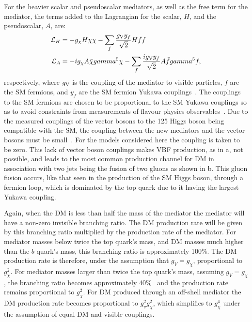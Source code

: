 For the heavier scalar and pseudoscalar mediators, as well as the free term for the mediator, the terms added to the Lagrangian for the scalar, $H$, and the pseudoscalar, $A$, are:
\begin{align}
  \mathcal{L}_{H}&=-g_{\chi}H\bar{\chi}\chi-\sum_{f}\frac{g_{\rm{V}}y_{f}}{\sqrt{2}}H\bar{f}f\\
  \mathcal{L}_{A}&=-ig_{\chi}A\bar{\chi}\gamma^{5}\chi-\sum_{f}\frac{ig_{\rm{V}}y_{f}}{\sqrt{2}}A\bar{f}\gamma^{5}f,\\
\end{align}
respectively, where $g_{\rm{V}}$ is the coupling of the mediator to visible particles, $f$ are the \ac{SM} fermions, and $y_{f}$ are the \ac{SM} fermion Yukawa couplings~\cite{PhysRevD.91.015017}. The couplings to the \ac{SM} fermions are chosen to be proportional to the \ac{SM} Yukawa couplings so as to avoid constraints from measurements of flavour physics observables~\cite{D'Ambrosio2002155}. Due to the measured couplings of the vector bosons to the 125 \GeV Higgs boson being compatible with the \ac{SM}, the coupling between the new mediators and the vector bosons must be small~\cite{CMS-PAS-HIG-15-002}. For the models considered here the coupling is taken to be zero. This lack of vector boson couplings makes \ac{VBF} production, as in a, not possible, and leads to the most common production channel for \ac{DM} in association with two jets being the fusion of two gluons as shown in b. This gluon fusion occurs, like that seen in the production of the \ac{SM} Higgs boson, through a fermion loop, which is dominated by the top quark due to it having the largest Yukawa coupling.

Again, when the \ac{DM} is less than half the mass of the mediator the mediator will have a non-zero invisible branching ratio. The \ac{DM} production rate will be given by this branching ratio multiplied by the production rate of the mediator. For mediator masses below twice the top quark's mass, and \ac{DM} masses much higher than the $b$ quark's mass, this branching ratio is approximately 100\%. The \ac{DM} production rate is therefore, under the assumption that $g_{V}=g_{\chi}$, proportional to $g_{\chi}^{2}$. For mediator masses larger than twice the top quark's mass, assuming $g_{V}=g_{\chi}$, the branching ratio becomes approximately 40\%~\cite{ourdmpaper} and the production rate remains proportional to $g_{\chi}^{2}$. For \ac{DM} produced through an off-shell mediator the \ac{DM} production rate becomes proportional to $g_{v}^{2}g_{\chi}^{2}$, which simplifies to $g_{\chi}^{4}$ under the assumption of equal \ac{DM} and visible couplings.


